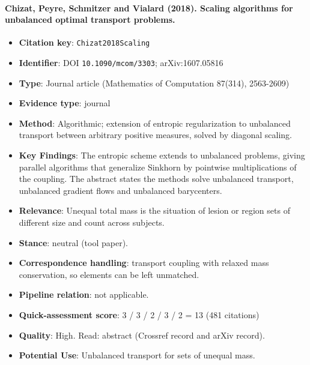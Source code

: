 \documentclass[journal,onecolumn]{IEEEtran}
\begin{document}
\paragraph{Chizat, Peyre, Schmitzer and Vialard (2018). Scaling algorithms for unbalanced optimal transport problems.~\cite{Chizat2018Scaling}}\mbox{}

\begin{itemize}

\item{} \textbf{Citation key}: \texttt{Chizat2018Scaling}

\item{} \textbf{Identifier}: DOI \nolinkurl{10.1090/mcom/3303}; arXiv:1607.05816

\item{} \textbf{Type}: Journal article (Mathematics of Computation 87(314), 2563-2609)

\item{} \textbf{Evidence type}: journal

\item{} \textbf{Method}: Algorithmic; extension of entropic regularization to unbalanced transport between arbitrary positive measures, solved by diagonal scaling.

\item{} \textbf{Key Findings}: The entropic scheme extends to unbalanced problems, giving parallel algorithms that generalize Sinkhorn by pointwise multiplications of the coupling. The abstract states the methods solve unbalanced transport, unbalanced gradient flows and unbalanced barycenters.

\item{} \textbf{Relevance}: Unequal total mass is the situation of lesion or region sets of different size and count across subjects.

\item{} \textbf{Stance}: neutral (tool paper).

\item{} \textbf{Correspondence handling}: transport coupling with relaxed mass conservation, so elements can be left unmatched.

\item{} \textbf{Pipeline relation}: not applicable.

\item{} \textbf{Quick-assessment score}: 3 / 3 / 2 / 3 / 2 = 13 (481 citations)

\item{} \textbf{Quality}: High. Read: abstract (Crossref record and arXiv record).

\item{} \textbf{Potential Use}: Unbalanced transport for sets of unequal mass.

\end{itemize}
\end{document}
